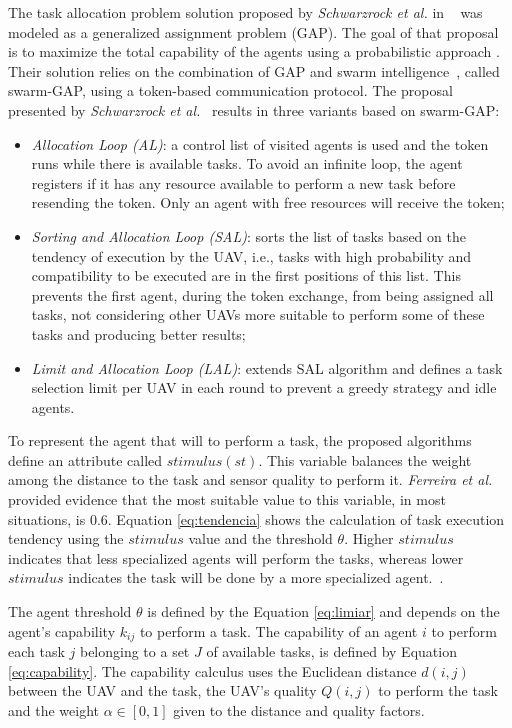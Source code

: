 The task allocation problem solution proposed by \textit{Schwarzrock et al.} in ~\citep{MAS07} was modeled as a generalized assignment problem (GAP)\citep{ferreira2007swarm}. The goal of that proposal is to maximize the total capability of the agents using a probabilistic approach \citep{theraulaz1998response}. Their solution relies on the combination of GAP and swarm intelligence~\citep{MOEA07}, called swarm-GAP, using a token-based communication protocol. The proposal presented by \textit{Schwarzrock et al.}~\citep{MAS07} results in three variants based on swarm-GAP:

\begin{itemize}
   \item \textit{Allocation Loop (AL)}: a control list of visited agents is used and the token runs while there is available tasks. To avoid an infinite loop, the agent registers if it has any resource available to perform a new task before resending the token. Only an agent with free resources will receive the token;
   \item \textit{Sorting and Allocation Loop (SAL)}: sorts the list of tasks based on the tendency of execution by the UAV, i.e., tasks with high probability and compatibility to be executed are in the first positions of this list. This prevents the first agent, during the token exchange, from being assigned all tasks, not considering other UAVs more suitable to perform some of these tasks and producing better results; 
   \item \textit{Limit and Allocation Loop (LAL)}: extends SAL algorithm and defines a task selection limit per UAV in each round to prevent a greedy strategy and idle agents.
\end{itemize}

To represent the agent that will to perform a task, the proposed algorithms define an attribute called $stimulus (st)$. This variable balances the weight among the distance to the task and sensor quality to perform it. \textit{Ferreira et al.}~\citep{ferreira2007swarm} provided evidence that the most suitable value to this variable, in most situations, is $0.6$. Equation \ref{eq:tendencia} shows the calculation of task execution tendency using the $stimulus$ value and the threshold $\theta$. Higher $stimulus$ indicates that less specialized agents will perform the tasks, whereas lower $stimulus$ indicates the task will be done by a more specialized agent.~\citep{MOEA07}. 

The agent threshold $\theta$ is defined by the Equation \ref{eq:limiar} and depends on the agent's capability $k_{ij}$ to perform a task. The capability of an agent $i$ to perform each task $j$ belonging to a set $J$ of available tasks, is defined by Equation \ref{eq:capability}. The capability calculus uses the Euclidean distance $d(i,j)$ between the UAV and the task, the UAV's quality $Q(i,j)$ to perform the task and the weight $\alpha \in [0,1]$ given to the distance and quality factors. 

